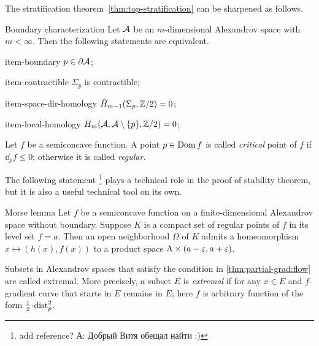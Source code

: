 The stratification theorem~\ref{thm:top-stratification} can be sharpened as follows.

\begin{thm}{Boundary characterization}
Let $\mathcal{A}$ be an $m$-dimensional Alexandrov space with $m<\infty$.
Then the following statements are equivalent.

\begin{subthm}{item-boundary} $p\in \partial \mathcal{A}$;
\end{subthm}

\begin{subthm}{item-contractible} $\Sigma_p$ is contractible;
\end{subthm}

\begin{subthm}{item-space-dir-homology} $\tilde H_{m-1}(\Sigma_p,\mathbb{Z}/2)= 0$;
\end{subthm}

\begin{subthm}{item-local-homology} $H_m(\mathcal{A},\mathcal{A}\setminus \{p\},\mathbb{Z}/2)= 0$;
\end{subthm}

\end{thm}

Let $f$ be a semiconcave function.
A point $p\in \mathop{\rm Dom}\nolimits f$ is called \emph{critical} point of $f$ if $\dd_pf\le 0$; 
otherwise it is called \emph{regular}.

The following statement \footnote{\red add reference? А: Добрый Витя обещал найти :)} plays a technical role in the proof of stability theorem,
but it is also a useful technical tool on its own.

\begin{thm}{Morse lemma}
Let $f$ be a semiconcave function on a finite-dimensional Alexandrov space without boundary.
Suppose $K$ is a compact set of regular points of $f$ in its level set $f=a$.
Then an open neighborhood $\Omega$ of $K$ admits a homeomorphism $x\mapsto (h(x),f(x))$ to a product space $\Lambda\times (a-\varepsilon,a+\varepsilon)$.
\end{thm}

Subsets in Alexandrov spaces that satisfy the condition in \ref{thm:partial-grad:flow} are called extremal.
More precisely, a subset $E$ is \emph{extremal} if for any $x\in E$
and $f$-gradient curve that starts in $E$ remains in $E$;
here $f$ is arbitrary function of the form $\tfrac12\cdot \distfun_p^2$. %

